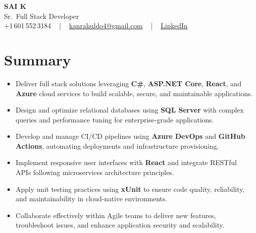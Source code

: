 \documentclass[letterpaper,11pt]{article}
\newcommand{\resumeItem}[1]{
  \item\footnotesize{
    {#1 \vspace{-2pt}}
  }
}
\newcommand{\resumeItemListStart}{\begin{itemize}[leftmargin=*]}
\newcommand{\resumeItemListEnd}{\end{itemize}\vspace{-5pt}}
\begin{document}
\begin{center}
    {\fontsize{14pt}{12pt}\selectfont \textbf{\MakeUppercase{Sai K}}}\\ \vspace{2pt}
    \fontsize{10pt}{12pt}\selectfont Sr.\ Full Stack Developer\\ \vspace{2pt}
    \fontsize{10pt}{12pt}\selectfont +1\,601\,552\,3184 ~ | ~
    \href{mailto:kanrahuldo4@gmail.com}{kanrahuldo4@gmail.com} ~ | ~
    \href{https://www.linkedin.com/in/srrrk/}{\color{blue}\underline{LinkedIn}}
    \vspace{-10pt}
\end{center}

\section{Summary}
\fontsize{9pt}{10pt}\selectfont
\resumeItemListStart
  \resumeItem{Deliver full stack solutions leveraging \textbf{C\#}, \textbf{ASP.NET Core}, \textbf{React}, and \textbf{Azure} cloud services to build scalable, secure, and maintainable applications.}
  \resumeItem{Design and optimize relational databases using \textbf{SQL Server} with complex queries and performance tuning for enterprise-grade applications.}
  \resumeItem{Develop and manage CI/CD pipelines using \textbf{Azure DevOps} and \textbf{GitHub Actions}, automating deployments and infrastructure provisioning.}
  \resumeItem{Implement responsive user interfaces with \textbf{React} and integrate RESTful APIs following microservices architecture principles.}
  \resumeItem{Apply unit testing practices using \textbf{xUnit} to ensure code quality, reliability, and maintainability in cloud-native environments.}
  \resumeItem{Collaborate effectively within Agile teams to deliver new features, troubleshoot issues, and enhance application security and scalability.}
\resumeItemListEnd
\vspace{-6pt}

\end{document}
